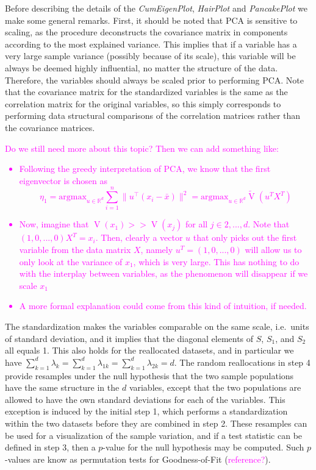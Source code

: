 \documentclass[titlepage,11pt,twoside]{article}
\newcommand{\hl}[1]{\textcolor{magenta}{#1}}
\newcommand{\RR}{\mathbb{R}}
\DeclareMathOperator*{\V}{V}
\newcommand{\argmax}{\text{argmax}}
\begin{document}
Before describing the details of the  \emph{CumEigenPlot}, \emph{HairPlot} and \emph{PancakePlot} we make some general remarks. First, it should be noted that PCA is sensitive to scaling, as the procedure deconstructs the covariance matrix in components according to the most explained variance. This implies that if a variable has a very large sample variance (possibly because of its scale), this variable will be always be deemed highly influential, no matter the structure of the data. Therefore, the variables should always be scaled prior to performing PCA. Note that the covariance matrix for the standardized variables is the same as the correlation matrix for the original variables, so this simply corresponds to performing data structural comparisons of the correlation matrices rather than the covariance matrices. \hl{Do we still need more about this topic? Then we can add something like:
\begin{itemize}
\item Following the greedy interpretation of PCA, we know that the first eigenvector is chosen as
$$\eta_1 = \argmax_{u \in \RR^d} \sum_{i=1}^n \lVert u^\top (x_i - \bar{x}) \rVert^2  = \text{argmax}_{u \in \RR^d} \tilde{\V}(u^T X^T) $$
\item Now, imagine that $\V(x_1) >> \V(x_j)$ for all $j \in 2, ..., d$. Note that $(1, 0, ..., 0) X^T = x_i$. Then, clearly a vector $u$ that only picks out the first variable from the data matrix $X$, namely $u^T = (1, 0, ..., 0)$ will allow us to only look at the variance of $x_1$, which is very large. This has nothing to do with the interplay between variables, as the phenomenon will disappear if we scale $x_1$
\item A more formal explanation could come from this kind of intuition, if needed.
\end{itemize}
}
The standardization makes the variables comparable on the same scale, i.e.\ units of standard deviation, and it implies that the diagonal elements of $S$, $S_1$, and $S_2$ all equals 1. This also holds for the reallocated datasets, and in particular we have $\sum_{k=1}^d \lambda_k = \sum_{k=1}^d \lambda_{1k} = \sum_{k=1}^d \lambda_{2k} =  d$. The random reallocations in step 4 provide resamples under the null hypothesis that the two sample populations have the same structure in the $d$ variables, except that the two populations are allowed to have the own standard deviations for each of the variables. This exception is induced by the initial step 1, which performs a standardization within the two datasets before they are combined in step 2. These resamples can be used for a visualization of the sample variation, and if a test statistic can be defined in step 3, then a $p$-value for the null hypothesis may be computed. Such $p$-values are know as permutation tests for Goodness-of-Fit (\hl{reference?}).
\end{document}
